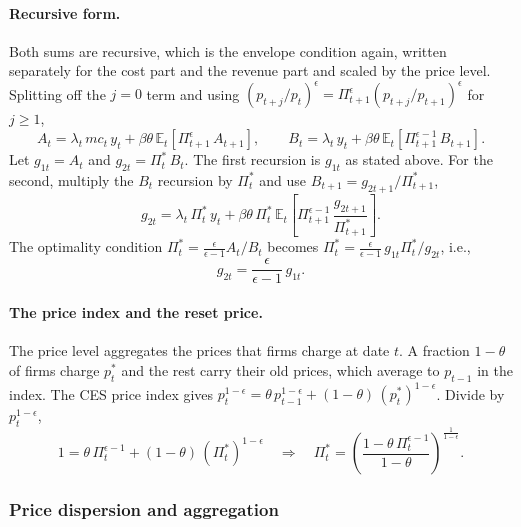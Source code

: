 \documentclass[11pt]{article}
\begin{document}
\paragraph{Recursive form.} Both sums are recursive, which is the envelope condition again, written separately for the cost part and the revenue part and scaled by the price level. Splitting off the $j=0$ term and using $(p_{t+j}/p_t)^{\epsilon} = \Pi_{t+1}^{\epsilon} (p_{t+j}/p_{t+1})^{\epsilon}$ for $j \ge 1$,
\begin{equation*}
A_t = \lambda_t\, mc_t\, y_t + \beta\theta\, \mathbb{E}_t \left[ \Pi_{t+1}^{\epsilon}\, A_{t+1} \right],
\qquad
B_t = \lambda_t\, y_t + \beta\theta\, \mathbb{E}_t \left[ \Pi_{t+1}^{\epsilon-1}\, B_{t+1} \right] .
\end{equation*}
Let $g_{1t} = A_t$ and $g_{2t} = \Pi_t^{*}\, B_t$. The first recursion is $g_{1t}$ as stated above. For the second, multiply the $B_t$ recursion by $\Pi_t^{*}$ and use $B_{t+1} = g_{2t+1}/\Pi_{t+1}^{*}$,
\begin{equation*}
g_{2t} = \lambda_t\, \Pi_t^{*}\, y_t + \beta\theta\, \Pi_t^{*}\, \mathbb{E}_t \left[ \Pi_{t+1}^{\epsilon-1}\, \frac{g_{2t+1}}{\Pi_{t+1}^{*}} \right] .
\end{equation*}
The optimality condition $\Pi_t^{*} = \tfrac{\epsilon}{\epsilon-1} A_t/B_t$ becomes $\Pi_t^{*} = \tfrac{\epsilon}{\epsilon-1}\, g_{1t} \Pi_t^{*}/g_{2t}$, i.e.,
\begin{equation*}
g_{2t} = \frac{\epsilon}{\epsilon-1}\, g_{1t} .
\end{equation*}

\paragraph{The price index and the reset price.} The price level aggregates the prices that firms charge at date $t$. A fraction $1-\theta$ of firms charge $p_t^{*}$ and the rest carry their old prices, which average to $p_{t-1}$ in the index. The CES price index gives $p_t^{1-\epsilon} = \theta\, p_{t-1}^{1-\epsilon} + (1-\theta)\, (p_t^{*})^{1-\epsilon}$. Divide by $p_t^{1-\epsilon}$,
\begin{equation*}
1 = \theta\, \Pi_t^{\epsilon-1} + (1-\theta)\, (\Pi_t^{*})^{1-\epsilon}
\quad \Longrightarrow \quad
\Pi_t^{*} = \left( \frac{1 - \theta\, \Pi_t^{\epsilon-1}}{1-\theta} \right)^{\frac{1}{1-\epsilon}} .
\end{equation*}

\subsubsection{Price dispersion and aggregation}
\end{document}
